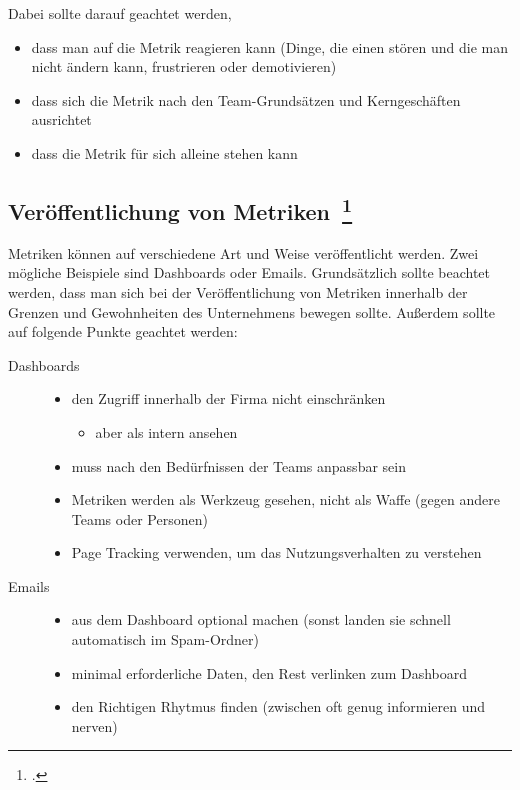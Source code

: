 Dabei sollte darauf geachtet werden,
\begin{itemize}
  \item dass man auf die Metrik reagieren kann (Dinge, die einen stören und die man nicht ändern kann, frustrieren oder demotivieren)
  \item dass sich die Metrik nach den Team-Grundsätzen und Kerngeschäften ausrichtet
  \item dass die Metrik für sich alleine stehen kann
\end{itemize}

\subsection[Veröffentlichung von Metriken]{Veröffentlichung von Metriken~\footcite[vgl.][S.177ff]{davis_agile_2015}}

Metriken können auf verschiedene Art und Weise veröffentlicht werden. Zwei mögliche Beispiele sind Dashboards oder Emails.
Grundsätzlich sollte beachtet werden, dass man sich bei der Veröffentlichung von Metriken innerhalb der Grenzen und Gewohnheiten des Unternehmens bewegen sollte.
Außerdem sollte auf folgende Punkte geachtet werden:

\begin{description}
  \item[Dashboards] \hfill
  \begin{itemize}[noitemsep]
    \item den Zugriff innerhalb der Firma nicht einschränken
    \begin{itemize}[noitemsep]
      \item aber als intern ansehen
    \end{itemize}
    \item muss nach den Bedürfnissen der Teams anpassbar sein
    \item Metriken werden als Werkzeug gesehen, nicht als Waffe (gegen andere Teams oder Personen)
    \item Page Tracking verwenden, um das Nutzungsverhalten zu verstehen
  \end{itemize}
  \item[Emails] \hfill
  \begin{itemize}[noitemsep]
    \item aus dem Dashboard optional machen (sonst landen sie schnell automatisch im Spam-Ordner)
    \item minimal erforderliche Daten, den Rest verlinken zum Dashboard
    \item den Richtigen Rhytmus finden (zwischen oft genug informieren und nerven)
  \end{itemize}
\end{description}

